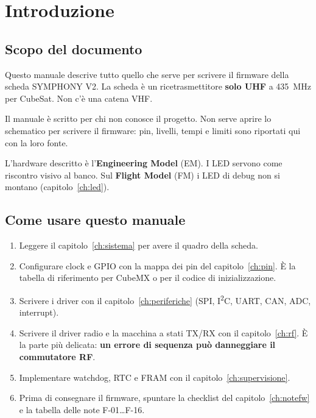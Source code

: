 \chapter{Introduzione}
\label{ch:intro}

\section{Scopo del documento}
Questo manuale descrive tutto quello che serve per scrivere il firmware della scheda SYMPHONY V2. La scheda è un ricetrasmettitore \textbf{solo UHF} a \SI{435}{\mega\hertz} per CubeSat. Non c'è una catena VHF.

Il manuale è scritto per chi non conosce il progetto. Non serve aprire lo schematico per scrivere il firmware: pin, livelli, tempi e limiti sono riportati qui con la loro fonte.

L'hardware descritto è l'\textbf{Engineering Model} (EM). I LED servono come riscontro visivo al banco. Sul \textbf{Flight Model} (FM) i LED di debug non si montano (capitolo~\ref{ch:led}).

\section{Come usare questo manuale}
\begin{enumerate}
\item Leggere il capitolo~\ref{ch:sistema} per avere il quadro della scheda.
\item Configurare clock e GPIO con la mappa dei pin del capitolo~\ref{ch:pin}. È la tabella di riferimento per CubeMX o per il codice di inizializzazione.
\item Scrivere i driver con il capitolo~\ref{ch:periferiche} (SPI, I\textsuperscript{2}C, UART, CAN, ADC, interrupt).
\item Scrivere il driver radio e la macchina a stati TX/RX con il capitolo~\ref{ch:rf}. È la parte più delicata: \textbf{un errore di sequenza può danneggiare il commutatore RF}.
\item Implementare watchdog, RTC e FRAM con il capitolo~\ref{ch:supervisione}.
\item Prima di consegnare il firmware, spuntare la checklist del capitolo~\ref{ch:notefw} e la tabella delle note F-01\ldots F-16.
\end{enumerate}


